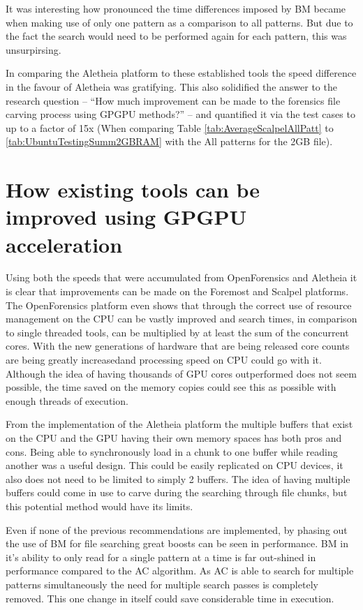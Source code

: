 It was interesting how pronounced the time differences imposed by \acl{BM} became when making use of only one pattern as a comparison to all patterns.
But due to the fact the search would need to be performed again for each pattern, this was unsurpirsing.

In comparing the Aletheia platform to these established tools the speed difference in the favour of Aletheia was gratifying.
This also solidified the answer to the research question -- ``How much improvement can be made to the forensics file carving process using \ac{GPGPU} methods?'' -- and quantified it via the test cases to up to a factor of 15x (When comparing Table \ref{tab:AverageScalpelAllPatt} to \ref{tab:UbuntuTestingSumm2GBRAM} with the All patterns for the 2GB file).
\newpage
\section{How existing tools can be improved using \ac{GPGPU} acceleration}
Using both the speeds that were accumulated from OpenForensics and Aletheia it is clear that improvements can be made on the Foremost and Scalpel platforms.
The OpenForensics platform even shows that through the correct use of resource management on the \ac{CPU} can be vastly improved and search times, in comparison to single threaded tools, can be multiplied by at least the sum of the concurrent cores.
With the new generations of hardware that are being released core counts are being greatly increased\footnotemark and processing speed on CPU could go with it.
Although the idea of having thousands of GPU cores outperformed does not seem possible, the time saved on the memory copies could see this as possible with enough threads of execution.

From the implementation of the Aletheia platform the multiple buffers that exist on the \ac{CPU} and the \ac{GPU} having their own memory spaces has both pros and cons.
Being able to synchronously load in a chunk to one buffer while reading another was a useful design.
This could be easily replicated on \ac{CPU} devices, it also does not need to be limited to simply 2 buffers.
The idea of having multiple buffers could come in use to carve during the searching through file chunks, but this potential method would have its limits.

Even if none of the previous recommendations are implemented, by phasing out the use of \acf{BM} for file searching great boosts can be seen in performance.
\ac{BM} in it's ability to only read for a single pattern at a time is far out-shined in performance compared to the \acf{AC} algorithm.
As \ac{AC} is able to search for multiple patterns simultaneously the need for multiple search passes is completely removed.
This one change in itself could save considerable time in execution.
